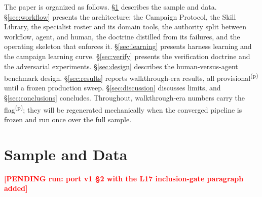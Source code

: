 \documentclass[twocolumn]{aastex631}
\newcommand{\PENDING}[1]{\textbf{\textcolor{red}{[PENDING run: #1]}}}
\newcommand{\prov}{\textsuperscript{(p)}}
\begin{document}
The paper is organized as follows. \S\ref{sec:sample} describes the sample
and data. \S\ref{sec:workflow} presents the architecture: the Campaign
Protocol, the Skill Library, the specialist roster and its domain tools,
the authority split between workflow, agent, and human, the doctrine
distilled from its failures, and the operating skeleton that enforces it.
\S\ref{sec:learning} presents harness learning and the campaign learning
curve. \S\ref{sec:verify} presents the verification doctrine and the
adversarial experiments. \S\ref{sec:design} describes the human-versus-agent
benchmark design. \S\ref{sec:results} reports walkthrough-era results, all
provisional\prov{} until a frozen production sweep. \S\ref{sec:discussion}
discusses limits, and \S\ref{sec:conclusions} concludes. Throughout,
walkthrough-era numbers carry the flag\prov{}; they will be regenerated
mechanically when the converged pipeline is frozen and run once over the
full sample.

\section{Sample and Data} \label{sec:sample}
\PENDING{port v1 \S2 with the L17 inclusion-gate paragraph added}










\end{document}
